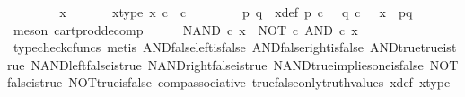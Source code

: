\begin{isabellebody}
\ \ \isamarkupfalse%
{\isacharminus}{\kern0pt}\isanewline
\ \ \ \ \isamarkupfalse%
\ x\ \isanewline
\ \ \ \ \isamarkupfalse%
\ x{\isacharunderscore}{\kern0pt}type{\isacharcolon}{\kern0pt}\ {\isachardoublequoteopen}x\ {\isasymin}\isactrlsub c\ {\isasymOmega}\ {\isasymtimes}\isactrlsub c\ {\isasymOmega}{\isachardoublequoteclose}\isanewline
\ \ \ \ \isamarkupfalse%
\ \isamarkupfalse%
\ p\ q\ \ x{\isacharunderscore}{\kern0pt}def{\isacharcolon}{\kern0pt}\ {\isachardoublequoteopen}p\ {\isasymin}\isactrlsub c\ {\isasymOmega}\ {\isasymand}\ q\ {\isasymin}\isactrlsub c\ {\isasymOmega}\ {\isasymand}\ x\ {\isacharequal}{\kern0pt}\ {\isasymlangle}p{\isacharcomma}{\kern0pt}q{\isasymrangle}{\isachardoublequoteclose}\isanewline
\ \ \ \ \ \ \isamarkupfalse%
\ {\isacharparenleft}{\kern0pt}meson\ cart{\isacharunderscore}{\kern0pt}prod{\isacharunderscore}{\kern0pt}decomp{\isacharparenright}{\kern0pt}\isanewline
\ \ \ \ \isamarkupfalse%
\ {\isachardoublequoteopen}NAND\ {\isasymcirc}\isactrlsub c\ x\ {\isacharequal}{\kern0pt}\ {\isacharparenleft}{\kern0pt}NOT\ {\isasymcirc}\isactrlsub c\ AND{\isacharparenright}{\kern0pt}\ {\isasymcirc}\isactrlsub c\ x{\isachardoublequoteclose}\isanewline
\ \ \ \ \ \ \isamarkupfalse%
\ {\isacharparenleft}{\kern0pt}typecheck{\isacharunderscore}{\kern0pt}cfuncs{\isacharcomma}{\kern0pt}\ metis\ AND{\isacharunderscore}{\kern0pt}false{\isacharunderscore}{\kern0pt}left{\isacharunderscore}{\kern0pt}is{\isacharunderscore}{\kern0pt}false\ AND{\isacharunderscore}{\kern0pt}false{\isacharunderscore}{\kern0pt}right{\isacharunderscore}{\kern0pt}is{\isacharunderscore}{\kern0pt}false\ AND{\isacharunderscore}{\kern0pt}true{\isacharunderscore}{\kern0pt}true{\isacharunderscore}{\kern0pt}is{\isacharunderscore}{\kern0pt}true\ NAND{\isacharunderscore}{\kern0pt}left{\isacharunderscore}{\kern0pt}false{\isacharunderscore}{\kern0pt}is{\isacharunderscore}{\kern0pt}true\ NAND{\isacharunderscore}{\kern0pt}right{\isacharunderscore}{\kern0pt}false{\isacharunderscore}{\kern0pt}is{\isacharunderscore}{\kern0pt}true\ NAND{\isacharunderscore}{\kern0pt}true{\isacharunderscore}{\kern0pt}implies{\isacharunderscore}{\kern0pt}one{\isacharunderscore}{\kern0pt}is{\isacharunderscore}{\kern0pt}false\ NOT{\isacharunderscore}{\kern0pt}false{\isacharunderscore}{\kern0pt}is{\isacharunderscore}{\kern0pt}true\ NOT{\isacharunderscore}{\kern0pt}true{\isacharunderscore}{\kern0pt}is{\isacharunderscore}{\kern0pt}false\ comp{\isacharunderscore}{\kern0pt}associative{}\ true{\isacharunderscore}{\kern0pt}false{\isacharunderscore}{\kern0pt}only{\isacharunderscore}{\kern0pt}truth{\isacharunderscore}{\kern0pt}values\ x{\isacharunderscore}{\kern0pt}def\ x{\isacharunderscore}{\kern0pt}type{\isacharparenright}{\kern0pt}\isanewline

\end{isabellebody}
